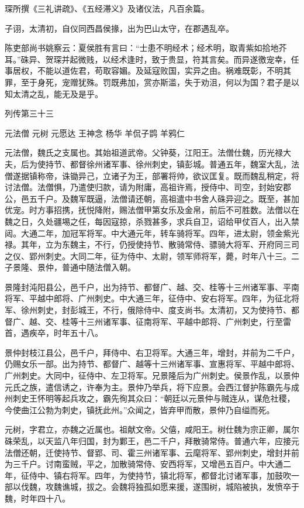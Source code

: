 \documentclass[12pt,UTF8]{ctexbook}
\begin{document}
琛所撰《三礼讲疏》、《五经滞义》及诸仪法，凡百余篇。

子诩，太清初，自仪同西昌侯掾，出为巴山太守，在郡遇乱卒。

陈吏部尚书姚察云：夏侯胜有言曰：“士患不明经术；经术明，取青紫如拾地芥耳。”硃异、贺琛并起微贱，以经术逢时，致于贵显，符其言矣。而异遂徼宠幸，任事居权，不能以道佐君，苟取容媚。及延寇败国，实异之由。祸难既彰，不明其罪，至于身死，宠赠犹殊。罚既弗加，赏亦斯滥，失于劝沮，何以为国？君子是以知太清之乱，能无及是乎。





列传第三十三

元法僧 元树 元愿达 王神念 杨华 羊侃子鹍 羊鸦仁

元法僧，魏氏之支属也。其始祖道武帝。父钟葵，江阳王。法僧仕魏，历光禄大夫，后为使持节、都督徐州诸军事、徐州刺史，镇彭城。普通五年，魏室大乱，法僧遂据镇称帝，诛锄异己，立诸子为王，部署将帅，欲议匡复。既而魏乱稍定，将讨法僧。法僧惧，乃遣使归款，请为附庸，高祖许焉，授侍中、司空，封始安郡公，邑五千户。及魏军既逼，法僧请还朝，高祖遣中书舍人硃异迎之。既至，甚加优宠。时方事招携，抚悦降附，赐法僧甲第女乐及金帛，前后不可胜数。法僧以在魏之日，久处疆埸之任，每因寇掠，杀戮甚多，求兵自卫，诏给甲仗百人，出入禁闼。大通二年，加冠军将军。中大通元年，转车骑将军。四年，进太尉，领金紫光禄。其年，立为东魏主，不行，仍授使持节、散骑常侍、骠骑大将军、开府同三司之仪、郢州刺史。大同二年，征为侍中、太尉，领军师将军，薨，时年八十三。二子景隆、景仲，普通中随法僧入朝。

景隆封沌阳县公，邑千户，出为持节、都督广、越、交、桂等十三州诸军事、平南将军、平越中郎将、广州刺史。中大通三年，征侍中、安右将军。四年，为征北将军、徐州刺史，封彭城王，不行，俄除侍中、度支尚书。太清初，又为使持节、都督广、越、交、桂等十三州诸军事、征南将军、平越中郎将、广州刺史，行至雷首，遇疾卒，时年五十八。

景仲封枝江县公，邑千户，拜侍中、右卫将军。大通三年，增封，并前为二千户，仍赐女乐一部。出为持节、都督广、越等十三州诸军事、宣惠将军、平越中郎将、广州刺史。大同中，征侍中、左卫将军。兄景隆后为广州刺史。侯景作乱，以景仲元氏之族，遣信诱之，许奉为主。景仲乃举兵，将下应景。会西江督护陈霸先与成州刺史王怀明等起兵攻之，霸先徇其众曰：“朝廷以元景仲与贼连从，谋危社稷，今使曲江公勃为刺史，镇抚此州。”众闻之，皆弃甲而散，景仲乃自缢而死。

元树，字君立，亦魏之近属也。祖献文帝。父僖，咸阳王。树仕魏为宗正卿，属尔硃荣乱，以天监八年归国，封为鄴王，邑二千户，拜散骑常侍。普通六年，应接元法僧还朝，迁使持节、督郢、司、霍三州诸军事、云麾将军、郢州刺史，增封并前为三千户。讨南蛮贼，平之，加散骑常侍、安西将军，又增邑五百户。中大通二年，征侍中、镇右将军。四年，为使持节，镇北将军，都督北讨诸军事，加鼓吹一部以伐魏，攻魏谯城，拔之。会魏将独孤如愿来援，遂围树，城陷被执，发愤卒于魏，时年四十八。
\end{document}
